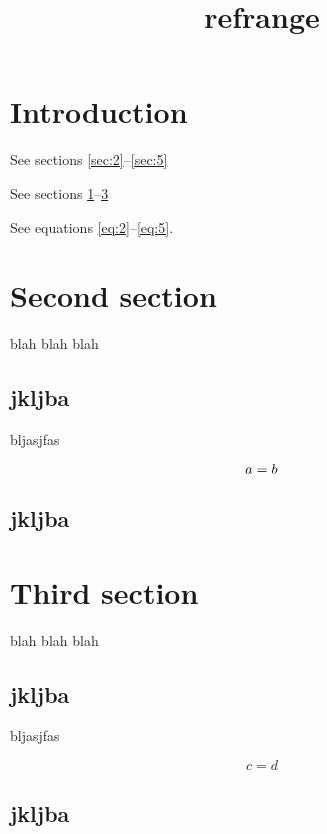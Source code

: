 \documentclass{amsart}
\title{refrange}
\providecommand\refRange[2]{\ref{#1}--\ref{#2}}
\providecommand\eqrefRange[2]{\eqref{#1}--\eqref{#2}}
\begin{document}
\maketitle

\section{Introduction}\label{sec:1}

See sections \refRange{sec:2}{sec:5}

See sections \refRange{sec:1}{sec:3}

See equations \eqrefRange{eq:2}{eq:5}.

\section{Second section}\label{sec:2}

blah blah blah

\subsection{jkljba}\label{ssec:1}

bljasjfas

\begin{equation}\tracingmacros1\label{eq:1}\tracingmacros0
a = b
\tracingmacros1\end{equation}

\subsection{jkljba}\label{ssec:2}

\section{Third section}\label{sec:3}

blah blah blah

\subsection{jkljba}\label{ssec:3}

bljasjfas

\begin{equation}\label{eq:2}
c = d
\end{equation}

\subsection{jkljba}\label{ssec:4}
\end{document}
